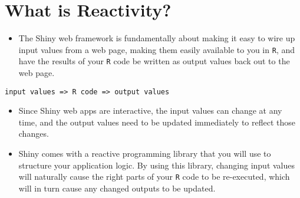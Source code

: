 \documentclass[a4paper,12pt]{article}
\begin{document}
\section*{What is Reactivity?}
\begin{itemize}
\item The Shiny web framework is fundamentally about making it easy to wire up input values from a web page, making them easily available to you in \texttt{R}, and have the results of your \texttt{R} code be written as output values back out to the web page.
\end{itemize}
\begin{framed}
\begin{verbatim}
input values => R code => output values
\end{verbatim}
\end{framed}

\begin{itemize}
\item Since Shiny web apps are interactive, the input values can change at any time, and the output values need to be updated immediately to reflect those changes.

\item Shiny comes with a reactive programming library that you will use to structure your application logic. By using this library, changing input values will naturally cause the right parts of your \texttt{R} code to be re-executed, which will in turn cause any changed outputs to be updated.
\end{itemize}
\end{document}
